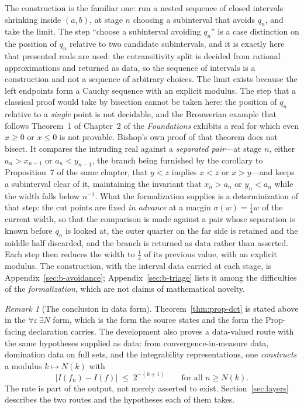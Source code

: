 \documentclass[11pt]{article}
\theoremstyle{definition}
\theoremstyle{remark}
\newtheorem{remark}[theorem]{Remark}
\begin{document}
The construction is the familiar one: run a nested sequence of closed intervals shrinking inside $(a,b)$, at stage $n$ choosing a subinterval that avoids $q_n$, and take the limit.  The step ``choose a subinterval avoiding $q_n$'' is a case distinction on the position of $q_n$ relative to two candidate subintervals, and it is exactly here that presented reals are used: the cotransitivity split is decided from rational approximations and returned as data, so the sequence of intervals is a construction and not a sequence of arbitrary choices.  The limit exists because the left endpoints form a Cauchy sequence with an explicit modulus.  The step that a classical proof would take by bisection cannot be taken here: the position of
$q_n$ relative to a \emph{single} point is not decidable, and the Brouwerian example that
follows Theorem~1 of Chapter~2 of the \emph{Foundations} exhibits a real for which even
$x\ge0$ or $x\le0$ is not provable.  Bishop's own proof of that theorem does not bisect.  It
compares the intruding real against a \emph{separated pair}---at stage $n$, either $a_n>x_{n-1}$ or $a_n<y_{n-1}$, the branch being furnished by the
corollary to Proposition~7 of the same chapter, that $y<z$ implies $x<z$ or $x>y$---and keeps a subinterval clear of it, maintaining the invariant
that $x_n>a_n$ or $y_n<a_n$ while the width falls below $n^{-1}$.  What the formalization
supplies is a determinization of that step: the cut points are fixed \emph{in advance} at a
margin $\sigma(w)=\tfrac14w$ of the current width, so that the comparison is made against a
pair whose separation is known before $q_n$ is looked at, the outer quarter on the far side
is retained and the middle half discarded, and the branch is returned as data rather than
asserted.  Each step then reduces the width to $\tfrac14$ of its previous value, with an
explicit modulus.  The construction, with the interval data carried at each stage, is
Appendix~\ref{sec:b-avoidance}; Appendix~\ref{sec:b-triage} lists it among the difficulties
of the \emph{formalization}, which are not claims of mathematical novelty.

\begin{remark}[The conclusion in data form]
\label{rem:modulus}
Theorem~\ref{thm:prop-dct} is stated above in the $\forall\varepsilon\,\exists N$ form, which
is the form the source states and the form the Prop-facing declaration carries.  The
development also proves a data-valued route with the same hypotheses supplied as data: from
convergence-in-measure data, domination data on full sets, and the integrability
representations, one \emph{constructs} a modulus $k\mapsto N(k)$ with
\[
|I(f_n)-I(f)|\;\le\;2^{-(k+1)}\qquad\text{for all }n\ge N(k).
\]
The rate is part of the output, not merely asserted to exist.  Section~\ref{sec:layers}
describes the two routes and the hypotheses each of them takes.
\end{remark}
\end{document}
